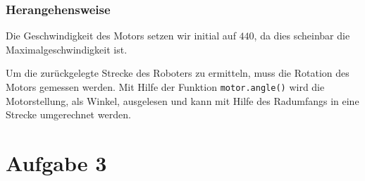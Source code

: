\documentclass[ngerman]{tudscrreprt}
\newcommand{\code}[1]{\texttt{#1}}
\begin{document}
\subsection{Herangehensweise}
Die Geschwindigkeit des Motors setzen wir initial auf $440$, da dies scheinbar die Maximalgeschwindigkeit ist.

Um die zurückgelegte Strecke des Roboters zu ermitteln, muss die Rotation des Motors gemessen werden.
Mit Hilfe der Funktion \code{motor.angle()} wird die Motorstellung, als Winkel, ausgelesen und kann
mit Hilfe des Radumfangs in eine Strecke umgerechnet werden.

\chapter{Aufgabe 3}
\end{document}
